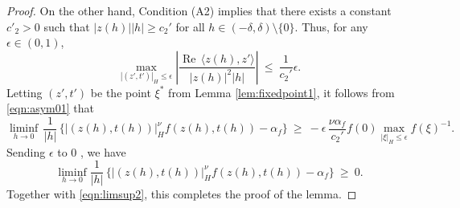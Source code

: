 \documentclass[10pt,a4paper]{amsart}
\begin{document}
\begin{proof}
On the other hand, Condition (A2) implies that there exists a constant $c'_2>0$ such 
that $|z(h)||h|\geq c_2'$ for all $h\in (-\delta,\delta)\setminus \{0\}$. Thus,
for any $\epsilon\in (0,1)$,  
\[
\max_{|(z',t')|_{\! H} \leq \epsilon} \left| \frac {\operatorname{Re}\, 
\langle z(h), z'\rangle}  {|z(h)|^2 |h|} \right| ~\leq~  \frac {1}{c_2'} \epsilon. 
\]
Letting $(z',t')$ be the point $\xi^{\ast}$ from Lemma \ref{lem:fixedpoint1}, it follows from \eqref{eqn:asym01} that
\begin{equation*}
\liminf_{h\to 0}\, \frac {1}{|h|} \, \Big\{ \bigl|(z(h),t(h)) \bigr|_{\! H}^{\nu} f(z(h),t(h)) - \alpha_f \Big\} 
~\geq~ - \epsilon\, \frac {\nu \alpha_f}{c_2'}  f(0) \max_{|\xi|_{\! H} \leq \epsilon} f(\xi)^{-1}.
\end{equation*}
Sending $\epsilon$ to 0 , we have
\begin{equation}
\liminf_{h\to 0}  \frac {1}{|h|} \, \Big\{ \bigl|(z(h),t(h)) \bigr|_{\! H}^{\nu} f(z(h),t(h)) - \alpha_f \Big\}
~\geq~ 0.
\end{equation}
Together with \eqref{eqn:limsup2}, this completes the proof of the lemma.
\end{proof}
\end{document}
